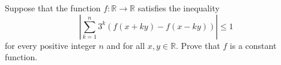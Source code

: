 \documentclass{article}
\begin{document}
	\setlength{\parindent}{0pt}
	Suppose that the function $f:\mathbb{R}\to\mathbb{R}$ satisfies the inequality
	$$\left\lvert \sum_{k=1}^{n}3^k(f(x+ky)-f(x-ky))\right\rvert\leq1$$
	for every positive integer $n$ and for all $x,y\in\mathbb{R}$. Prove that $f$ is a constant function.
\end{document}
